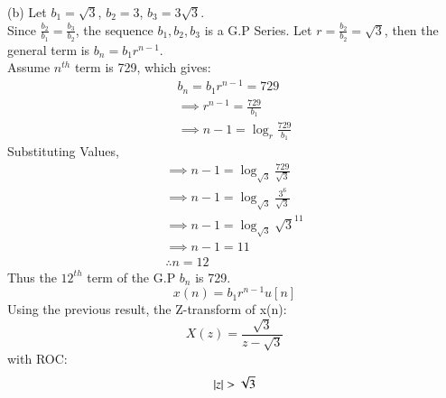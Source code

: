 \documentclass[journal,12pt,twocolumn]{IEEEtran}
\theoremstyle{remark}
\begin{document}
(b) Let $b_1 = \sqrt{3}$, $b_2 = 3$, $b_3 = 3\sqrt{3}$.\\
Since $\frac{b_2}{b_1} = \frac{b_3}{b_2}$, the sequence $b_1, b_2, b_3$ is a G.P Series.
Let $r = \frac{b_2}{b_2} = \sqrt{3}$, then the general term is $b_n = b_1 r^{n-1}$.\\
Assume $n^{th}$ term is 729, which gives: 
\begin{gather*}
    b_n = b_1 r^{n-1} = 729\\
    \implies r^{n-1} = \frac{729}{b_1}\\
    \implies n - 1 = \log_{r}{\frac{729}{b_1}}
\end{gather*}
Substituting Values,
\begin{gather*}
    \implies n - 1 = \log_{\sqrt{3}}{\frac{729}{\sqrt{3}}}\\
    \implies n - 1 = \log_{\sqrt{3}}{\frac{3^6}{\sqrt{3}}}\\
    \implies n - 1 = \log_{\sqrt{3}}{\sqrt{3}^{11}}\\
    \implies n - 1 = 11\\
    \therefore n = 12
\end{gather*}
Thus the $12^{th}$ term of the G.P $b_n$ is 729.
\[ x(n) = b_1r^{n - 1}u[n] \]
Using the previous result, the Z-transform of x(n):
\[X(z) = \frac{\sqrt{3}}{z - \sqrt{3}}\]
with ROC: \[ \left\vert z\right\vert > \sqrt{3} \]
\end{document}
